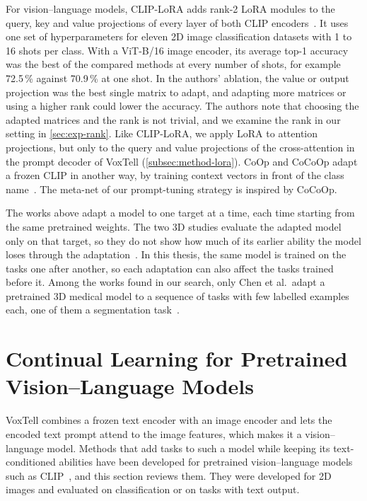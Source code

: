 For vision--language models, CLIP-LoRA adds rank-2 LoRA modules to the query, key and value projections of every layer of both CLIP encoders~\cite{zanella2024lowrankfewshotadaptationvisionlanguage}.
It uses one set of hyperparameters for eleven 2D image classification datasets with 1 to 16 shots per class.
With a ViT-B/16 image encoder, its average top-1 accuracy was the best of the compared methods at every number of shots, for example 72.5\,\% against 70.9\,\% at one shot.
In the authors' ablation, the value or output projection was the best single matrix to adapt, and adapting more matrices or using a higher rank could lower the accuracy.
The authors note that choosing the adapted matrices and the rank is not trivial, and we examine the rank in our setting in \cref{sec:exp-rank}.
Like CLIP-LoRA, we apply LoRA to attention projections, but only to the query and value projections of the cross-attention in the prompt decoder of VoxTell (\cref{subsec:method-lora}).
CoOp and CoCoOp adapt a frozen CLIP in another way, by training context vectors in front of the class name~\cite{zhou2022coop,zhou2022cocoop}.
The meta-net of our prompt-tuning strategy is inspired by CoCoOp.

The works above adapt a model to one target at a time, each time starting from the same pretrained weights.
The two 3D studies evaluate the adapted model only on that target, so they do not show how much of its earlier ability the model loses through the adaptation~\cite{silvarodriguez2023fseft,ly2026seapeft}.
In this thesis, the same model is trained on the tasks one after another, so each adaptation can also affect the tasks trained before it.
Among the works found in our search, only Chen et al.\ adapt a pretrained 3D medical model to a sequence of tasks with few labelled examples each, one of them a segmentation task~\cite{chen2026fewshotcontinuallearning3d}.

\section[Continual Learning for Pretrained Vision--Language Models]{Continual Learning for Pretrained\texorpdfstring{\newline}{ } Vision--Language Models}
\label{sec:cl-vlm}

VoxTell combines a frozen text encoder with an image encoder and lets the encoded text prompt attend to the image features, which makes it a vision--language model.
Methods that add tasks to such a model while keeping its text-conditioned abilities have been developed for pretrained vision--language models such as CLIP~\cite{radford2021learningtransferablevisualmodels}, and this section reviews them.
They were developed for 2D images and evaluated on classification or on tasks with text output.

